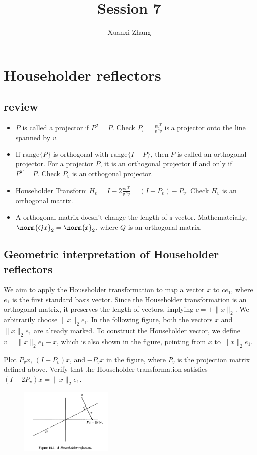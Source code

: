 \documentclass{article}%
\title{\huge Session 7\\
\normalsize}
\author{Xuanxi Zhang}
\begin{document}
\maketitle
\section{Householder reflectors}
\subsection{review}
\begin{itemize}
    \item $P$ is called a projector if $P^2 = P$. Check $P_v=\frac{vv^T}{v^Tv}$ is a projector onto the line spanned by $v$.
    \item If $\text{range}\{P\}$ is orthogonal with $\text{range}\{I-P\}$, then $P$ is called an orthogonal projector. For a projector $P$, it is an orthogonal projector if and only if $P^T=P$. Check $P_v$ is an orthogonal projector. 
    \item Householder Transform $H_v=I-2\frac{vv^T}{v^Tv}=(I-P_v)-P_v$. Check $H_v$ is an orthogonal matrix.
    \item A orthogonal matrix doesn't change the length of a vector. Mathematcially, $\norm{Qx}_2=\norm{x}_2$, where $Q$ is an orthogonal matrix.
\end{itemize}


\subsection{Geometric interpretation of Householder reflectors}
We aim to apply the Householder transformation to map a vector \( x \) to \( c e_1 \), where \( e_1 \) is the first standard basis vector. Since the Householder transformation is an orthogonal matrix, it preserves the length of vectors, implying \( c = \pm \|x\|_2 \). We arbitrarily choose \( \|x\|_2 e_1 \). In the following figure, both the vectors \( x \) and \( \|x\|_2 e_1 \) are already marked. To construct the Householder vector, we define \( v = \|x\|_2 e_1 - x \), which is also shown in the figure, pointing from \( x \) to \( \|x\|_2 e_1 \).

Plot \( P_v x \), \( (I - P_v) x \), and \( -P_v x \) in the figure, where \( P_v \) is the projection matrix defined above. Verify that the Householder transformation satisfies \( (I - 2P_v) x = \|x\|_2 e_1 \).


\begin{figure}[H]
    \centering
    \includegraphics[width = 0.4\textwidth]{./1.png}
\end{figure}
\end{document}
